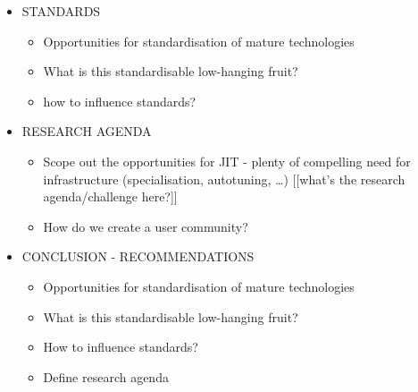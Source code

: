 \begin{itemize}
\item STANDARDS
  \begin{itemize}
  \item Opportunities for standardisation of mature technologies
  \item What is this standardisable low-hanging fruit?
  \item how to influence standards?
  \end{itemize}

\item RESEARCH AGENDA
  \begin{itemize}
  \item Scope out the opportunities for JIT - plenty of compelling need for infrastructure (specialisation, autotuning, …) [[what’s the research agenda/challenge here?]]
  \item How do we create a user community?
  \end{itemize}

\item CONCLUSION - RECOMMENDATIONS
  \begin{itemize}
  \item Opportunities for standardisation of mature technologies
  \item What is this standardisable low-hanging fruit?
  \item How to influence standards?
  \item Define research agenda
  \end{itemize}

\end{itemize}

